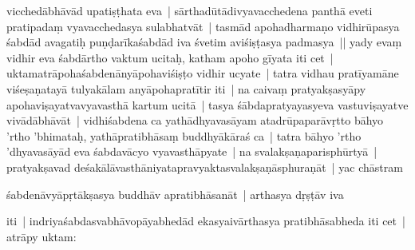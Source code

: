 \documentclass[article,12pt,a4paper]{memoir}%
\newcounter{parCount}
\begin{document}
vicchedābhāvād upatiṣṭhata eva | sārthadūtādivyavacchedena panthā eveti pratipadaṃ vyavacchedasya sulabhatvāt | tasmād apohadharmaṇo vidhirūpasya śabdād avagatiḥ puṇḍarīkaśabdād iva śvetim aviśiṣṭasya padmasya || \label{thakur75-60.16} yady evaṃ vidhir eva śabdārtho vaktum ucitaḥ, katham apoho gīyata iti cet | uktamatrāpohaśabdenānyāpohaviśiṣṭo vidhir ucyate | tatra vidhau pratīyamāne viśeṣaṇatayā tulyakālam anyāpohapratītir iti | \label{thakur75-60.19} na caivaṃ pratyakṣasyāpy apohaviṣayatvavyavasthā kartum ucitā | tasya śābdapratyayasyeva vastuviṣayatve vivādābhāvāt | vidhiśabdena ca yathādhyavasāyam atadrūpaparāvṛtto bāhyo 'rtho 'bhimataḥ, yathāpratibhāsaṃ buddhyākāraś ca | tatra bāhyo 'rtho 'dhyavasāyād eva śabdavācyo vyavasthāpyate | na svalakṣaṇaparisphūrtyā | pratyakṣavad deśakālāvasthāniyatapravyaktasvalakṣaṇāsphuraṇāt | yac chāstram
	{}
	\pend%
      

	  \pstart \leavevmode%
	śabdenāvyāpṛtākṣasya buddhāv apratibhāsanāt | arthasya dṛṣṭāv iva 
	{}
	\pend%
      

	  \pstart \leavevmode%
	iti | indriyaśabdasvabhāvopāyabhedād ekasyaivārthasya pratibhāsabheda iti cet | atrāpy uktam:
	{}
	\pend%
      
\end{document}
